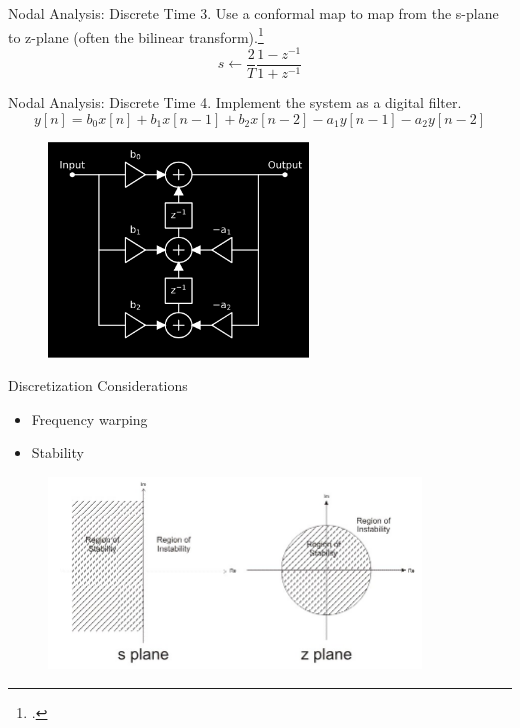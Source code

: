 \begin{frame}{Nodal Analysis: Discrete Time}
    3. Use a conformal map to map from the s-plane to z-plane
    (often the bilinear transform).\footcite{pasp}
    \begin{equation}
        s \leftarrow \frac{2}{T} \frac{1 - z^{-1}}{1 + z^{-1}}
    \end{equation}
\end{frame}

\begin{frame}{Nodal Analysis: Discrete Time}
    4. Implement the system as a digital filter.
    \begin{equation}
        y[n] = b_0 x[n] + b_1 x[n-1] + b_2 x[n-2] - a_1 y[n-1] - a_2 y[n-2]
    \end{equation}
    \vspace{-0.5cm}
    \begin{figure}
        \centering
        \includegraphics[height=2.25in]{Figures/TDF-II.png}
    \end{figure}
\end{frame}

\begin{frame}{Discretization Considerations}
    \vspace{1ex}
    \begin{itemize}
        \itemsep0em
        \item Frequency warping
        \item Stability
    \end{itemize}
    \begin{figure}
        \centering
        \includegraphics[height=2.0in]{Figures/bilinear_mapping.jpg}
    \end{figure}
\end{frame}

